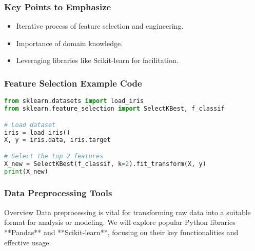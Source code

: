 \documentclass[aspectratio=169]{beamer}
\begin{document}
\begin{frame}[fragile]
    \frametitle{Key Points to Emphasize}
    \begin{itemize}
        \item Iterative process of feature selection and engineering.
        \item Importance of domain knowledge.
        \item Leveraging libraries like Scikit-learn for facilitation.
    \end{itemize}
\end{frame}

\begin{frame}[fragile]
    \frametitle{Feature Selection Example Code}
    \begin{lstlisting}[language=Python]
from sklearn.datasets import load_iris
from sklearn.feature_selection import SelectKBest, f_classif

# Load dataset
iris = load_iris()
X, y = iris.data, iris.target

# Select the top 2 features
X_new = SelectKBest(f_classif, k=2).fit_transform(X, y)
print(X_new)
    \end{lstlisting}
\end{frame}

\begin{frame}
    \frametitle{Data Preprocessing Tools}
    \begin{block}{Overview}
        Data preprocessing is vital for transforming raw data into a suitable format for analysis or modeling.
        We will explore popular Python libraries **Pandas** and **Scikit-learn**, focusing on their key functionalities and effective usage.
    \end{block}
\end{frame}
\end{document}
